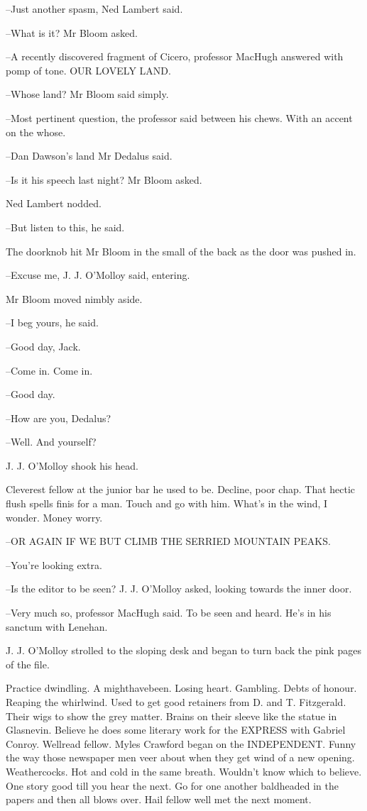 --Just another spasm, Ned Lambert said.

--What is it? Mr Bloom asked.

--A recently discovered fragment of Cicero, professor MacHugh answered
with pomp of tone. OUR LOVELY LAND.



--Whose land? Mr Bloom said simply.

--Most pertinent question, the professor said between his chews. With an
accent on the whose.

--Dan Dawson's land Mr Dedalus said.

--Is it his speech last night? Mr Bloom asked.

Ned Lambert nodded.

--But listen to this, he said.

The doorknob hit Mr Bloom in the small of the back as the door was
pushed in.

--Excuse me, J. J. O'Molloy said, entering.

Mr Bloom moved nimbly aside.

--I beg yours, he said.

--Good day, Jack.

--Come in. Come in.

--Good day.

--How are you, Dedalus?

--Well. And yourself?

J. J. O'Molloy shook his head.



Cleverest fellow at the junior bar he used to be. Decline, poor chap.
That hectic flush spells finis for a man. Touch and go with him. What's in
the wind, I wonder. Money worry.

--OR AGAIN IF WE BUT CLIMB THE SERRIED MOUNTAIN PEAKS.

--You're looking extra.

--Is the editor to be seen? J. J. O'Molloy asked, looking towards the
inner door.

--Very much so, professor MacHugh said. To be seen and heard. He's in
his sanctum with Lenehan.

J. J. O'Molloy strolled to the sloping desk and began to turn back the
pink pages of the file.

Practice dwindling. A mighthavebeen. Losing heart. Gambling. Debts
of honour. Reaping the whirlwind. Used to get good retainers from D. and
T. Fitzgerald. Their wigs to show the grey matter. Brains on their sleeve
like the statue in Glasnevin. Believe he does some literary work for the
EXPRESS with Gabriel Conroy. Wellread fellow. Myles Crawford began on
the INDEPENDENT. Funny the way those newspaper men veer about when
they get wind of a new opening. Weathercocks. Hot and cold in the same
breath. Wouldn't know which to believe. One story good till you hear the
next. Go for one another baldheaded in the papers and then all blows over.
Hail fellow well met the next moment.

